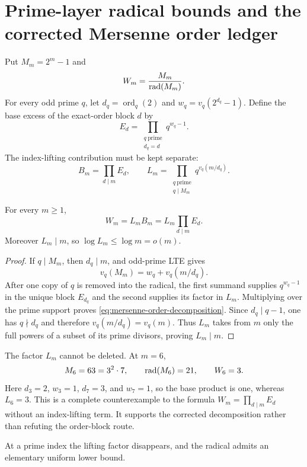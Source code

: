 \section{Prime-layer radical bounds and the corrected Mersenne order ledger}
\label{sec:mersenne-prime-layer}

Put $M_m=2^m-1$ and
\[
                 W_m=\frac{M_m}{\operatorname{rad}(M_m)}.
\]
For every odd prime $q$, let $d_q=\operatorname{ord}_q(2)$ and
$w_q=v_q(2^{d_q}-1)$.  Define the base excess of the exact-order block $d$ by
\[
                E_d=\prod_{\substack{q\ {\mathrm{prime}}\\d_q=d}}
                         q^{w_q-1}.
\]
The index-lifting contribution must be kept separate:
\[
 B_m=\prod_{d\mid m}E_d,\qquad
 L_m=\prod_{\substack{q\ {\mathrm{prime}}\\q\mid M_m}}
                         q^{v_q(m/d_q)}.
\]

\begin{theorem}
\label{thm:mersenne-order-decomposition}
For every $m\ge1$,
\begin{equation}\label{eq:mersenne-order-decomposition}
                       W_m=L_mB_m=L_m\prod_{d\mid m}E_d.
\end{equation}
Moreover $L_m\mid m$, so $\log L_m\le\log m=o(m)$.
\end{theorem}

\begin{proof}
If $q\mid M_m$, then $d_q\mid m$, and odd-prime LTE gives
\[
 v_q(M_m)=w_q+v_q(m/d_q).
\]
After one copy of $q$ is removed into the radical, the first summand supplies
$q^{w_q-1}$ in the unique block $E_{d_q}$ and the second supplies its factor
in $L_m$.  Multiplying over the prime support proves
\eqref{eq:mersenne-order-decomposition}.  Since $d_q\mid q-1$, one has
$q\nmid d_q$ and therefore $v_q(m/d_q)=v_q(m)$.  Thus $L_m$ takes from $m$
only the full powers of a subset of its prime divisors, proving $L_m\mid m$.
\end{proof}

The factor $L_m$ cannot be deleted.  At $m=6$,
\[
 M_6=63=3^2\cdot7,\qquad \operatorname{rad}(M_6)=21,\qquad W_6=3.
\]
Here $d_3=2$, $w_3=1$, $d_7=3$, and $w_7=1$, so the base product is one,
whereas $L_6=3$.  This is a complete counterexample to the formula
$W_m=\prod_{d\mid m}E_d$ without an index-lifting term.  It supports the
corrected decomposition rather than refuting the order-block route.

At a prime index the lifting factor disappears, and the radical admits an
elementary uniform lower bound.

